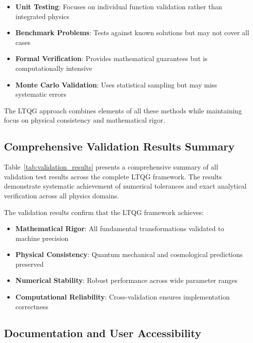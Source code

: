 \begin{itemize}
\item \textbf{Unit Testing}: Focuses on individual function validation rather than integrated physics
\item \textbf{Benchmark Problems}: Tests against known solutions but may not cover all cases
\item \textbf{Formal Verification}: Provides mathematical guarantees but is computationally intensive
\item \textbf{Monte Carlo Validation}: Uses statistical sampling but may miss systematic errors
\end{itemize}

The LTQG approach combines elements of all these methods while maintaining focus on physical consistency and mathematical rigor.

\subsection{Comprehensive Validation Results Summary}
\label{subsec:comprehensive_validation_summary}

Table~\ref{tab:validation_results} presents a comprehensive summary of all validation test results across the complete LTQG framework. The results demonstrate systematic achievement of numerical tolerances and exact analytical verification across all physics domains.



The validation results confirm that the LTQG framework achieves:
\begin{itemize}
\item \textbf{Mathematical Rigor}: All fundamental transformations validated to machine precision
\item \textbf{Physical Consistency}: Quantum mechanical and cosmological predictions preserved
\item \textbf{Numerical Stability}: Robust performance across wide parameter ranges
\item \textbf{Computational Reliability}: Cross-validation ensures implementation correctness
\end{itemize}

\subsection{Documentation and User Accessibility}
\label{subsec:documentation_accessibility}

